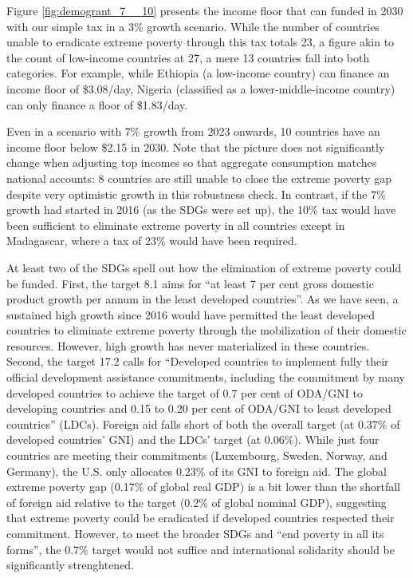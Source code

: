 Figure \ref{fig:demogrant_7__10} presents the income floor that can funded in 2030 with our simple tax in a 3\% growth scenario. While the number of countries unable to eradicate extreme poverty through this tax totals 23, a figure akin to the count of low-income countries at 27, a mere 13 countries fall into both categories.
For example, while Ethiopia (a low-income country) can finance an income floor of \$3.08/day, Nigeria (classified as a lower-middle-income country) can only finance a floor of \$1.83/day. 

Even in a scenario with 7\% growth from 2023 onwards, 10 countries have an income floor below \$2.15 in 2030. Note that the picture does not significantly change when adjusting top incomes so that aggregate consumption matches national accounts:\cite{deaton_measuring_2005,prydz_disparities_2022} 
8 countries are still unable to close the extreme poverty gap despite very optimistic growth in this robustness check. In contrast, if the 7\% growth had started in 2016 (as the SDGs were set up), the 10\% tax would have been sufficient to eliminate extreme poverty in all countries except in Madagascar, where a tax of 23\% would have been required.

At least two of the SDGs spell out how the elimination of extreme poverty could be funded. %
First, the target 8.1 aims for ``at least 7 per cent gross domestic product growth per annum in the least developed countries''. As we have seen, a sustained high growth since 2016 would have permitted the least developed countries to eliminate extreme poverty through the mobilization of their domestic resources. However, high growth has never materialized in these countries. 
Second, the target 17.2 calls for ``Developed countries to implement fully their official development assistance commitments, including the commitment by many developed countries to achieve the target of 0.7 per cent of ODA/GNI to developing countries and 0.15 to 0.20 per cent of ODA/GNI to least developed countries'' (LDCs). Foreign aid falls short of both the overall target (at 0.37\% of developed countries' GNI) and the LDCs' target (at 0.06\%). While just four countries are meeting their commitments (Luxembourg, Sweden, Norway, and Germany), the U.S. only allocates 0.23\% of its GNI to foreign aid.\cite{oecd_oda_2023} The global extreme poverty gap (0.17\% of global real GDP) is a bit lower than the shortfall of foreign aid relative to the target (0.2\% of global nominal GDP), suggesting that extreme poverty could be eradicated if developed countries respected their commitment. %
However, to meet the broader SDGs and ``end poverty in all its forms'', the 0.7\% target would not suffice and international solidarity should be significantly strenghtened. %

